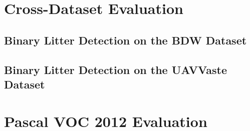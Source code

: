 
\section{Cross-Dataset Evaluation}
\label{sec:5_cross_dataset_exp}

\subsection{Binary Litter Detection on the BDW Dataset}
\label{subsec:5_bdw_exp}


\subsection{Binary Litter Detection on the UAVVaste Dataset}
\label{subsec:5_uavvaste_exp}


\section{Pascal VOC 2012 Evaluation}
\label{sec:5_pascal_voc_dataset_exp}

